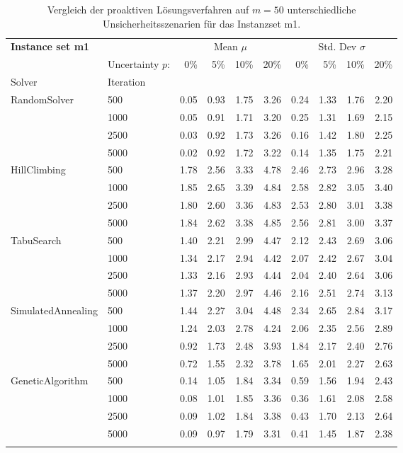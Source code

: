 {\footnotesize
\begin{longtable}{ll|rrrr|rrrr}
\toprule
\textbf{Instance set m1}                 & {} & \multicolumn{4}{c|}{Mean $\mu$} & \multicolumn{4}{c}{Std. Dev $\sigma$} \\
                & Uncertainty $p$: & 0\% & 5\% & 10\% & 20\% & 0\% & 5\% & 10\% & 20\% \\
Solver & Iteration &      &      &      &      &      &      &      &      \\
\midrule
RandomSolver & 500  & 0.05 & 0.93 & 1.75 & 3.26 & 0.24 & 1.33 & 1.76 & 2.20 \\
                 & 1000 & 0.05 & 0.91 & 1.71 & 3.20 & 0.25 & 1.31 & 1.69 & 2.15 \\
                 & 2500 & 0.03 & 0.92 & 1.73 & 3.26 & 0.16 & 1.42 & 1.80 & 2.25 \\
                 & 5000 & 0.02 & 0.92 & 1.72 & 3.22 & 0.14 & 1.35 & 1.75 & 2.21 \\ \hline
HillClimbing & 500  & 1.78 & 2.56 & 3.33 & 4.78 & 2.46 & 2.73 & 2.96 & 3.28 \\
                 & 1000 & 1.85 & 2.65 & 3.39 & 4.84 & 2.58 & 2.82 & 3.05 & 3.40 \\
                 & 2500 & 1.80 & 2.60 & 3.36 & 4.83 & 2.53 & 2.80 & 3.01 & 3.38 \\
                 & 5000 & 1.84 & 2.62 & 3.38 & 4.85 & 2.56 & 2.81 & 3.00 & 3.37 \\ \hline
TabuSearch & 500  & 1.40 & 2.21 & 2.99 & 4.47 & 2.12 & 2.43 & 2.69 & 3.06 \\
                 & 1000 & 1.34 & 2.17 & 2.94 & 4.42 & 2.07 & 2.42 & 2.67 & 3.04 \\
                 & 2500 & 1.33 & 2.16 & 2.93 & 4.44 & 2.04 & 2.40 & 2.64 & 3.06 \\
                 & 5000 & 1.37 & 2.20 & 2.97 & 4.46 & 2.16 & 2.51 & 2.74 & 3.13 \\ \hline
SimulatedAnnealing & 500  & 1.44 & 2.27 & 3.04 & 4.48 & 2.34 & 2.65 & 2.84 & 3.17 \\
                 & 1000 & 1.24 & 2.03 & 2.78 & 4.24 & 2.06 & 2.35 & 2.56 & 2.89 \\
                 & 2500 & 0.92 & 1.73 & 2.48 & 3.93 & 1.84 & 2.17 & 2.40 & 2.76 \\
                 & 5000 & 0.72 & 1.55 & 2.32 & 3.78 & 1.65 & 2.01 & 2.27 & 2.63 \\ \hline
GeneticAlgorithm & 500  & 0.14 & 1.05 & 1.84 & 3.34 & 0.59 & 1.56 & 1.94 & 2.43 \\
                 & 1000 & 0.08 & 1.01 & 1.85 & 3.36 & 0.36 & 1.61 & 2.08 & 2.58 \\
                 & 2500 & 0.09 & 1.02 & 1.84 & 3.38 & 0.43 & 1.70 & 2.13 & 2.64 \\
                 & 5000 & 0.09 & 0.97 & 1.79 & 3.31 & 0.41 & 1.45 & 1.87 & 2.38 \\
\bottomrule
\caption{Vergleich der proaktiven Lösungsverfahren auf $m=50$ unterschiedliche Unsicherheitsszenarien für das Instanzset m1. }
\label{tab:evaluation_proactive_m1}
\end{longtable}
}
